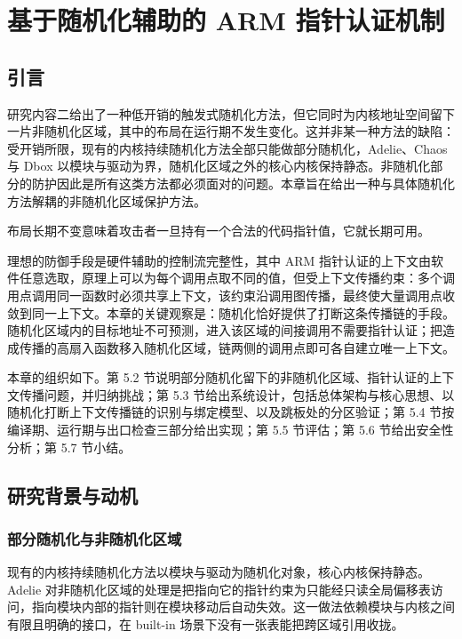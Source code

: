 \chapter{基于随机化辅助的 ARM 指针认证机制}
\label{chap:5}

\section{引言}

研究内容二给出了一种低开销的触发式随机化方法，但它同时为内核地址空间留下一片非随机化区域，其中的布局在运行期不发生变化。这并非某一种方法的缺陷：受开销所限，现有的内核持续随机化方法全部只能做部分随机化，Adelie\citep{nikolaev2022adelie}、Chaos\citep{chang2024chaos} 与 Dbox\citep{li2024dbox} 以模块与驱动为界，随机化区域之外的核心内核保持静态。非随机化部分的防护因此是所有这类方法都必须面对的问题。本章旨在给出一种与具体随机化方法解耦的非随机化区域保护方法。

布局长期不变意味着攻击者一旦持有一个合法的代码指针值，它就长期可用。

理想的防御手段是硬件辅助的控制流完整性，其中 ARM 指针认证的上下文由软件任意选取，原理上可以为每个调用点取不同的值，但受上下文传播约束：多个调用点调用同一函数时必须共享上下文，该约束沿调用图传播，最终使大量调用点收敛到同一上下文。本章的关键观察是：随机化恰好提供了打断这条传播链的手段。随机化区域内的目标地址不可预测，进入该区域的间接调用不需要指针认证；把造成传播的高扇入函数移入随机化区域，链两侧的调用点即可各自建立唯一上下文。

本章的组织如下。第 5.2 节说明部分随机化留下的非随机化区域、指针认证的上下文传播问题，并归纳挑战；第 5.3 节给出系统设计，包括总体架构与核心思想、以随机化打断上下文传播链的识别与绑定模型、以及跳板处的分区验证；第 5.4 节按编译期、运行期与出口检查三部分给出实现；第 5.5 节评估；第 5.6 节给出安全性分析；第 5.7 节小结。

\section{研究背景与动机}

\subsection{部分随机化与非随机化区域}

现有的内核持续随机化方法以模块与驱动为随机化对象，核心内核保持静态。Adelie 对非随机化区域的处理是把指向它的指针约束为只能经只读全局偏移表访问，指向模块内部的指针则在模块移动后自动失效。这一做法依赖模块与内核之间有限且明确的接口，在 built-in 场景下没有一张表能把跨区域引用收拢。

